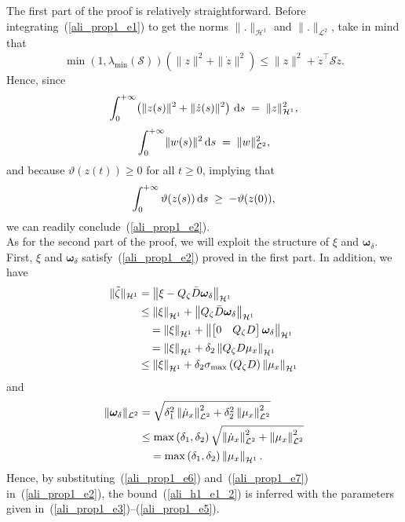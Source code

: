 \documentclass{ifacconf}
\def\eqref#1{(\ref{#1})}
\begin{document}
\begin{pf}
The first part of the proof is relatively straightforward. Before integrating~\eqref{ali_prop1_e1} to get the norms $\| . \|_{\mathcal{H}^{1}}$ and $\| . \|_{\mathcal{L}^{2}}$, take in mind that
$$
\min\left(1,\lambda_{\min}(\mathcal{S})\right) \left(  \| z \|^{2} +  \| \dot{z} \|^{2}  \right) \leq \| z \|^{2} + \dot{z}^{\top} \mathcal{S} \dot{z}.
$$
%
Hence, since 
$$
\int_{0}^{+\infty} \!\left( \| z(s) \|^{2} + \| \dot{z}(s) \|^{2} \right) \, {\rm d}s \;=\; \| z \|^{2}_{\mathcal{H}^{1}},
$$
$$
\int_{0}^{+\infty} \! \| w(s) \|^{2} \, {\rm d}s \;=\; \| w \|^{2}_{\mathcal{L}^{2}},
$$
and because $\vartheta(z(t)) \geq 0$ for all $t \geq 0$, implying that 
$$
\int_{0}^{+\infty} \vartheta(z(s)) \, {\rm d}s \;\geq\; - \vartheta(z(0)),
$$
we can readily conclude~\eqref{ali_prop1_e2}.\\
As for the second part of the proof, we will exploit the structure of $\xi$ and $\bm{\omega}_{\delta}$. First, $\xi$ and $\bm{\omega}_{\delta}$ satisfy~\eqref{ali_prop1_e2} proved in the first part. In addition, we have
%
\begin{align}\label{ali_prop1_e6}
\| \tilde{\zeta} \|_{\mathcal{H}^{1}} &= \left\| \xi - Q_{\zeta} \bar{D} \bm{\omega}_{\delta} \right\|_{\mathcal{H}^{1}} \notag \\
&\leq \left\| \xi \right\|_{\mathcal{H}^{1}} + \left\| Q_{\zeta} \bar{D} \bm{\omega}_{\delta} \right\|_{\mathcal{H}^{1}} \notag \\
&\quad= \left\| \xi \right\|_{\mathcal{H}^{1}} + \left\| \begin{bmatrix}0 & Q_{\zeta} D \end{bmatrix} \bm{\omega}_{\delta} \right\|_{\mathcal{H}^{1}} \notag \\
&\quad= \left\| \xi \right\|_{\mathcal{H}^{1}} + \delta_{2} \left\| Q_{\zeta} D \mu_{x} \right\|_{\mathcal{H}^{1}} \notag \\
&\leq \left\| \xi \right\|_{\mathcal{H}^{1}} + \delta_{2} \sigma_{\max}\left(Q_{\zeta}D\right) \left\| \mu_{x} \right\|_{\mathcal{H}^{1}}
\end{align}
and
%
\begin{align}\label{ali_prop1_e7}
\| \bm{\omega}_{\delta} \|_{\mathcal{L}^{2}} &= \sqrt{ \delta^{2}_{1}  \left\| \dot{\mu}_{x} \right\|^{2}_{\mathcal{L}^{2}} + \delta^{2}_{2}  \left\| \mu_{x} \right\|^{2}_{\mathcal{L}^{2}} } \notag \\
&\leq \max\left(\delta_{1}, \delta_{2} \right)  \sqrt{ \left\| \dot{\mu}_{x} \right\|^{2}_{\mathcal{L}^{2}} + \left\| \mu_{x} \right\|^{2}_{\mathcal{L}^{2}} } \notag \\
&\quad= \max\left(\delta_{1}, \delta_{2} \right) \left\| \mu_{x} \right\|_{\mathcal{H}^{1}}.
\end{align}
Hence, by substituting~\eqref{ali_prop1_e6} and~\eqref{ali_prop1_e7} in~\eqref{ali_prop1_e2}, the bound~\eqref{ali_h1_e1_2} is inferred with the parameters given in~\eqref{ali_prop1_e3}--\eqref{ali_prop1_e5}.
%
\end{pf}
\end{document}
